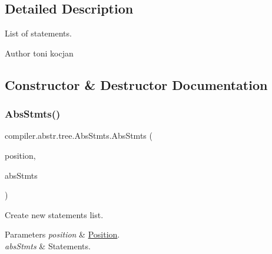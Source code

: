 \subsection{Detailed Description}
List of statements. \begin{DoxyAuthor}{Author}
toni kocjan 
\end{DoxyAuthor}


\subsection{Constructor \& Destructor Documentation}
\mbox{\label{classcompiler_1_1abstr_1_1tree_1_1_abs_stmts_ae15c4d33cbbe4c8211323b5c07499499}} 
\subsubsection{\texorpdfstring{Abs\+Stmts()}{AbsStmts()}\hspace{0.1cm}{\footnotesize\ttfamily [1/2]}}
{\footnotesize\ttfamily compiler.\+abstr.\+tree.\+Abs\+Stmts.\+Abs\+Stmts (\begin{DoxyParamCaption}\item[{\hyperlink{classcompiler_1_1_position}{Position}}]{position,  }\item[{Linked\+List$<$ \hyperlink{classcompiler_1_1abstr_1_1tree_1_1_abs_stmt}{Abs\+Stmt} $>$}]{abs\+Stmts }\end{DoxyParamCaption})}

Create new statements list. 
\begin{DoxyParams}{Parameters}
{\em position} & \hyperlink{classcompiler_1_1_position}{Position}. \\
\hline
{\em abs\+Stmts} & Statements. \\
\hline
\end{DoxyParams}
\mbox{\label{classcompiler_1_1abstr_1_1tree_1_1_abs_stmts_ad1be108e84442b930f22a7fe7e274e89}} 
